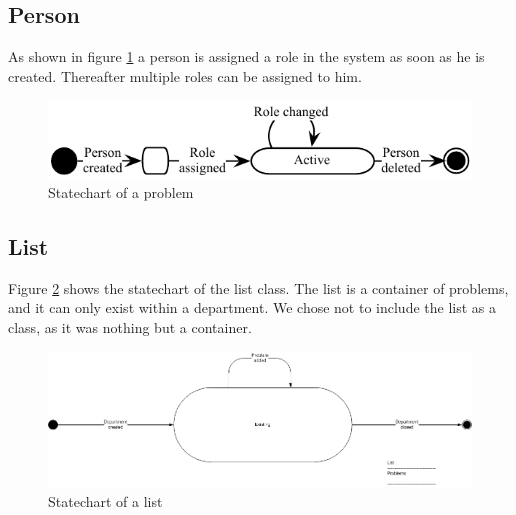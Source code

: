 \subsection{Person}
As shown in figure \ref{fig:Klasse_diagram_person} a person is assigned a role in the system as soon as he is created. Thereafter multiple roles can be assigned to him.
\begin{figure}[H]
\begin{center}
\includegraphics[scale=1]{input/problem_domain_analysis/Klassediagram_person.pdf}
\caption{Statechart of a problem}
\label{fig:Klasse_diagram_person}
\end{center}
\end{figure}

\subsection{List}
Figure \ref{fig:Klasse_diagram_list} shows the statechart of the list class. The list is a container of problems, and it can only exist within a department. We chose not to include the list as a class, as it was nothing but a container.
\begin{figure}[H]
\begin{center}
\includegraphics[width=1\textwidth]{input/problem_domain_analysis/Klassediagram_list.jpg}
\caption{Statechart of a list}
\label{fig:Klasse_diagram_list}
\end{center}
\end{figure}

